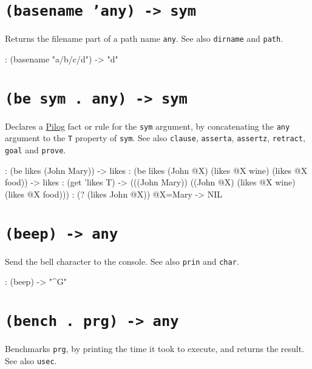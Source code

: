  
\section*{\texttt{(basename 'any) -> sym}}
\label{sec:funct-ref-B-(basename-'any)-->-sym}


Returns the filename part of a path name \texttt{any}. See also \texttt{dirname} and
\texttt{path}.


\begin{wideverbatim}
: (basename "a/b/c/d")
-> "d"
\end{wideverbatim}

 
\section*{\texttt{(be sym . any) -> sym}}
\label{sec:funct-ref-B-(be-sym-.-any)-->-sym}


Declares a \hyperref[ref.html-pilog]{Pilog} fact or rule for the \texttt{sym}
argument, by concatenating the \texttt{any} argument to the \texttt{T} property of
\texttt{sym}. See also \texttt{clause}, \texttt{asserta}, \texttt{assertz}, \texttt{retract}, \texttt{goal} and
\texttt{prove}.


\begin{wideverbatim}
: (be likes (John Mary))
-> likes
: (be likes (John @X) (likes @X wine) (likes @X food))
-> likes
: (get 'likes T)
-> (((John Mary)) ((John @X) (likes @X wine) (likes @X food)))
: (? (likes John @X))
 @X=Mary
-> NIL
\end{wideverbatim}

 
\section*{\texttt{(beep) -> any}}
\label{sec:funct-ref-B-(beep)-->-any}


Send the bell character to the console. See also \texttt{prin} and \texttt{char}.


\begin{wideverbatim}
: (beep)
-> "^G"
\end{wideverbatim}

 
\section*{\texttt{(bench . prg) -> any}}
\label{sec:funct-ref-B-(bench-.-prg)-->-any}


Benchmarks \texttt{prg}, by printing the time it took to execute, and returns
the result. See also \texttt{usec}.


